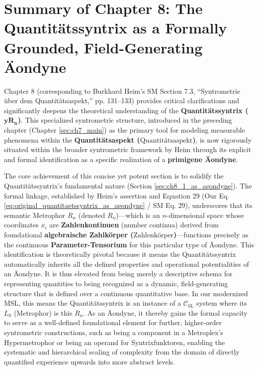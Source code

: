 \documentclass[
    12pt,              %
    a4paper,           %
    headings=normal,   %
    twoside=true,      %
    BCOR=8mm,          %
]{scrbook}
\newcommand{\q}[1]{\enquote{#1}}
\newcommand{\quantitaetsaspekt}{\text{Quantitätsaspekt}}
\newcommand{\quantitaetssyntrix}{\bm{yR_n}}
\newcommand{\zahlenkoerper}{\text{Zahlenkörper}}
\newcommand{\semantischermetrophor}{R_n}
\begin{document}
\section{Summary of Chapter 8: The Quantitätssyntrix as a Formally Grounded, Field-Generating Äondyne}
\label{sec:ch8_4_summary}

Chapter 8 (corresponding to Burkhard Heim's SM Section 7.3, \q{Syntrometrie über dem Quantitätsaspekt,} pp. 131–133) provides critical clarifications and significantly deepens the theoretical understanding of the \textbf{Quantitätssyntrix (\(\quantitaetssyntrix\))}. This specialized syntrometric structure, introduced in the preceding chapter (Chapter \ref{sec:ch7_main}) as the primary tool for modeling measurable phenomena within the \textbf{Quantitätsaspekt (\(\quantitaetsaspekt\))}, is now rigorously situated within the broader syntrometric framework by Heim through its explicit and formal identification as a specific realization of a \textbf{primigene Äondyne}.

The core achievement of this concise yet potent section is to solidify the Quantitätssyntrix’s fundamental nature (Section \ref{sec:ch8_1_as_aeondyne}). The formal linkage, established by Heim's assertion and Equation 29 (Our Eq. \eqref{eq:original_quantitaetssyntrix_as_aeondyne} / SM Eq. 29), underscores that its semantic Metrophor \(\semantischermetrophor\) (denoted \(R_n\))—which is an \(n\)-dimensional space whose coordinates \(x_i\) are \textbf{Zahlenkontinuen} (number continua) derived from foundational \textbf{algebraische Zahlkörper (\(\zahlenkoerper\))}—functions precisely as the continuous \textbf{Parameter-Tensorium} for this particular type of Äondyne. This identification is theoretically pivotal because it means the Quantitätssyntrix automatically inherits all the defined properties and operational potentialities of an Äondyne. It is thus elevated from being merely a descriptive schema for representing quantities to being recognized as a dynamic, field-generating structure that is defined over a continuous quantitative base. In our modernized MSL, this means the Quantitätssyntrix is an instance of a \(\mathcal{C}_{\text{SL}}\) system where its \(L_0\) (Metrophor) is this \(\semantischermetrophor\). As an Äondyne, it thereby gains the formal capacity to serve as a well-defined foundational element for further, higher-order syntrometric constructions, such as being a component in a Metroplex’s Hypermetrophor or being an operand for Syntrixfunktoren, enabling the systematic and hierarchical scaling of complexity from the domain of directly quantified experience upwards into more abstract levels.
\end{document}
